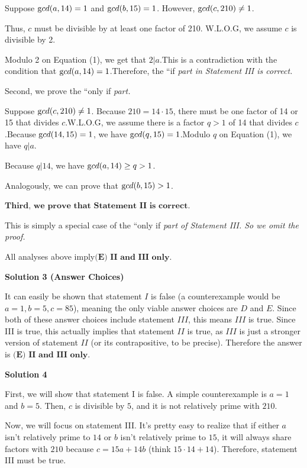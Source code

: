 \begin{enumerate}
 Suppose ${\textrm gcd}(a , 14) = 1$ and ${\textrm gcd}(b, 15) = 1$. However, ${\textrm gcd} (c, 210) \neq 1$.

 Thus, $c$ must be divisible by at least one factor of 210. W.L.O.G, we assume $c$ is divisible by 2.

 Modulo 2 on Equation (1), we get that $2 | a$.This is a contradiction with the condition that ${\textrm gcd}(a , 14) = 1$.Therefore, the ``if\textit{ part in Statement III is correct.}

 Second, we prove the ``only if\textit{ part.}

 Suppose ${\textrm gcd} (c, 210) \neq 1$. Because $210 = 14 \cdot 15$, there must be one factor of 14 or 15 that divides $c$.W.L.O.G, we assume there is a factor $q > 1$ of 14 that divides $c$.Because ${\textrm gcd} (14, 15) = 1$, we have ${\textrm gcd} (q, 15) = 1$.Modulo $q$ on Equation (1), we have $q | a$.

 Because $q | 14$, we have ${\textrm gcd}(a , 14) \geq q > 1$.

 Analogously, we can prove that ${\textrm gcd}(b , 15) > 1$.

 $\textbf{Third, we prove that Statement II is correct.}$

 This is simply a special case of the ``only if\textit{ part of Statement III. So we omit the proof.}

 All analyses above imply$\boxed{\textbf{(E) II and III only}}.$




\textbf{Solution 3 (Answer Choices)}

It can easily be shown that statement $I$ is false (a counterexample would be $a=1, b=5, c=85$), meaning the only viable answer choices are $D$ and $E$. Since both of these answer choices include statement $III$, this means $III$ is true. Since III is true, this actually implies that statement $II$ is true, as $III$ is just a stronger version of statement $II$ (or its contrapositive, to be precise). Therefore the answer is $\boxed{\textbf{(E) II and III only}}.$




\textbf{Solution 4}

First, we will show that statement I is false. A simple counterexample is $a=1$ and $b=5$. Then, $c$ is divisible by $5$, and it is not relatively prime with $210$.

 
Now, we will focus on statement III. It's pretty easy to realize that if either $a$ isn't relatively prime to $14$ or $b$ isn't relatively prime to $15$, it will always share factors with $210$ because $c = 15a + 14b$ (think $15 \cdot 14 + 14$). Therefore, statement III must be true. 


\end{enumerate}
